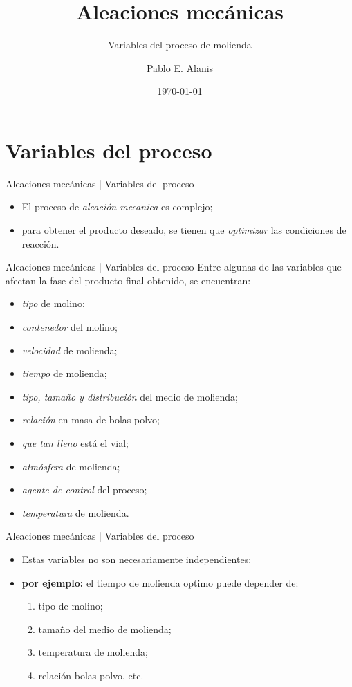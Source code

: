 \documentclass[%
spanish,
progressbar=head,
background=dark,
]{beamer}
\title{Aleaciones mecánicas}
\subtitle{Variables del proceso de molienda}
\date{\today}
\author{Pablo E. Alanis}
\institute{Universidad Autónoma de Nuevo Leon, División de Posgrado\\Técnicas de preparación de materiales}
\begin{document}
\maketitle

\section{Variables del proceso}
\begin{frame}{Aleaciones mecánicas | Variables del proceso}
    \begin{itemize}
        \item El proceso de \emph{aleación mecanica} es complejo;
        \item para obtener el producto deseado, se tienen que \textit{optimizar} las condiciones de reacción.
    \end{itemize}
\end{frame}

\begin{frame}{Aleaciones mecánicas | Variables del proceso}
    Entre algunas de las variables que afectan la fase del producto final obtenido, se encuentran:

    \begin{itemize}
        \item \emph{tipo} de molino;
        \item \emph{contenedor} del molino;
        \item \emph{velocidad} de molienda;
        \item \emph{tiempo} de molienda;
        \item \emph{tipo, tamaño y distribución} del medio de molienda;
        \item \emph{relación} en masa de bolas-polvo;
        \item \emph{que tan lleno} está el vial;
        \item \emph{atmósfera} de molienda;
        \item \emph{agente de control} del proceso;
        \item \emph{temperatura} de molienda.
    \end{itemize}
\end{frame}

\begin{frame}{Aleaciones mecánicas | Variables del proceso}
\begin{itemize}
    \item Estas variables no son necesariamente independientes;\\
    \item[] \textbf{por ejemplo:} el tiempo de molienda optimo puede depender de: 
    \begin{enumerate}
        \item tipo de molino;
        \item tamaño del medio de molienda;
        \item temperatura de molienda;
        \item relación bolas-polvo, etc.
    \end{enumerate}
\end{itemize}
\end{frame}
\end{document}
